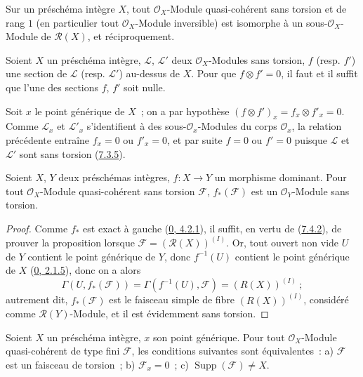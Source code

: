 \begin{corollary}[7.4.3]
\label{I.7.4.3-fr}
Sur un préschéma intègre $X$, tout $\mathscr{O}_X$-Module quasi-cohérent sans
torsion et de rang $1$ (en particulier tout $\mathscr{O}_X$-Module
inversible) est isomorphe à un sous-$\mathscr{O}_X$-Module de
$\mathscr{R}(X)$, et réciproquement.
\end{corollary}

\begin{corollary}[7.4.4]
\label{I.7.4.4-fr}
Soient $X$ un préschéma intègre, $\mathscr{L}$, $\mathscr{L}'$ deux
$\mathscr{O}_X$-Modules sans torsion, $f$ (resp. $f'$) une section de
$\mathscr{L}$ (resp. $\mathscr{L}'$) au-dessus de $X$. Pour que
$f\otimes f'=0$, il faut et il suffit que l'une des sections $f$, $f'$ soit
nulle.
\end{corollary}

Soit $x$ le point générique de $X$~; on a par hypothèse
$(f\otimes f')_x=f_x\otimes f'_x=0$. Comme $\mathscr{L}_x$ et
$\mathscr{L}'_x$ s'identifient à des sous-$\mathscr{O}_x$-Modules du corps
$\mathscr{O}_x$, la relation précédente entraîne $f_x=0$ ou $f'_x=0$, et par
suite $f=0$ ou $f'=0$ puisque $\mathscr{L}$ et $\mathscr{L}'$ sont sans
torsion (\hyperref[I.7.3.5-fr]{7.3.5}).

\begin{proposition}[7.4.5]
\label{I.7.4.5-fr}
Soient $X$, $Y$ deux préschémas intègres, $f:X\to Y$ un morphisme dominant.
Pour tout $\mathscr{O}_X$-Module quasi-cohérent sans torsion $\mathscr{F}$,
$f_*(\mathscr{F})$ est un $\mathscr{O}_Y$-Module sans torsion.
\end{proposition}

\begin{proof}
Comme $f_*$ est exact à gauche
(\hyperref[0.4.2.1-fr]{0, 4.2.1}), il suffit, en vertu de
(\hyperref[I.7.4.2-fr]{7.4.2}), de prouver la proposition lorsque
$\mathscr{F}=(\mathscr{R}(X))^{(I)}$. Or, tout ouvert non vide $U$ de $Y$
contient le point générique de $Y$, donc $f^{-1}(U)$ contient le point
générique de $X$ (\hyperref[0.2.1.5-fr]{0, 2.1.5}), donc on a alors
\[
  \Gamma(U,f_*(\mathscr{F}))
  =\Gamma(f^{-1}(U),\mathscr{F})=(R(X))^{(I)}~;
\]
autrement dit, $f_*(\mathscr{F})$ est le faisceau simple de fibre
$(R(X))^{(I)}$, considéré comme $\mathscr{R}(Y)$-Module, et il est évidemment
sans torsion.
\end{proof}

\begin{proposition}[7.4.6]
\label{I.7.4.6-fr}
Soient $X$ un préschéma intègre, $x$ son point générique. Pour tout
$\mathscr{O}_X$-Module quasi-cohérent de type fini $\mathscr{F}$, les
conditions suivantes sont équivalentes~: a) $\mathscr{F}$ est un faisceau de
torsion~; b) $\mathscr{F}_x=0$~; c)
$\operatorname{Supp}(\mathscr{F})\neq X$.
\end{proposition}

